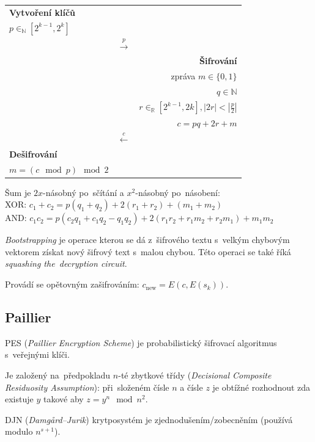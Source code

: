 \begin{table}[ht]
    \centering
    \begin{tabular}{lcr}
    \textbf{Vytvoření klíčů} && \\
    $p \in_\mathbb{N} [2^{k-1}, 2^k]$ \\
    & $\stackrel{p}{\rightarrow}$ & \\
    && \textbf{Šifrování} \\
    && zpráva $m \in \{0,1\}$ \\
    && $q \in \mathbb{N}$ \\
    && $r \in_\mathbb{R} [2^{k-1}, 2k], |2r| < |\frac{p}{2}|$ \\
    && $c = pq + 2r + m$ \\
    & $\stackrel{c}{\leftarrow}$ & \\
    \textbf{Dešifrování} && \\
    $m = (c \mod p) \mod 2$ && \\
    \end{tabular}
\end{table}
\FloatBarrier

Šum je $2x$-násobný po~sčítání a $x^2$-násobný po~násobení:
\\XOR: $c_1 + c_2 = p(q_1 + q_2) + 2(r_1 + r_2) + (m_1 + m_2)$
\\AND: $c_1 c_2 = p(c_2 q_1 + c_1 q_2 - q_1 q_2) + 2(r_1 r_2 + r_1 m_2 + r_2 m_1) + m_1 m_2$


\emph{Bootstrapping} je operace kterou se dá z~šifrového textu s~velkým chybovým vektorem získat nový šifrový text s~malou chybou.
Této operaci se také říká \emph{squashing the~decryption circuit}.

Provádí se opětovným zašifrováním: $c_\text{new} = E(c, E(s_k))$.

\subsection{Paillier}

PES (\emph{Paillier Encryption Scheme}) je probabilistický šifrovací algoritmus s~veřejnými klíči.

Je založený na~předpokladu $n$-té zbytkové třídy (\emph{Decisional Composite Residuosity Assumption}): při~složeném čísle $n$ a čísle $z$ je obtížné rozhodnout zda existuje $y$ takové aby $z = y^n \mod n^2$.

DJN (\emph{Damgård--Jurik}) krytposystém je zjednodušením/zobecněním (používá modulo $n^{s+1}$).

